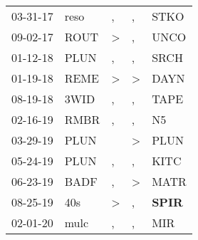 \begin{supertabular}{p{0.07\textwidth}p{0.06\textwidth}p{0.02\textwidth}p{0.02\textwidth}p{0.06\textwidth}}
          03-31-17\textsuperscript{} &           reso\textsuperscript{} &                , &                , &           STKO\textsuperscript{} \\
          09-02-17\textsuperscript{} &           ROUT\textsuperscript{} &     \textgreater &                , &           UNCO\textsuperscript{} \\
          01-12-18\textsuperscript{} &           PLUN\textsuperscript{} &                , &                , &           SRCH\textsuperscript{} \\
          01-19-18\textsuperscript{} &           REME\textsuperscript{} &     \textgreater &     \textgreater &           DAYN\textsuperscript{} \\
          08-19-18\textsuperscript{} &           3WID\textsuperscript{} &                , &                , &           TAPE\textsuperscript{} \\
          02-16-19\textsuperscript{} &           RMBR\textsuperscript{} &                , &                , &             N5\textsuperscript{} \\
          03-29-19\textsuperscript{} &           PLUN\textsuperscript{} &                  &     \textgreater &           PLUN\textsuperscript{} \\
          05-24-19\textsuperscript{} &           PLUN\textsuperscript{} &                , &                , &           KITC\textsuperscript{} \\
          06-23-19\textsuperscript{} &           BADF\textsuperscript{} &                , &     \textgreater &           MATR\textsuperscript{} \\
          08-25-19\textsuperscript{} &            40s\textsuperscript{} &     \textgreater &                , &  \textbf{SPIR\textsuperscript{}} \\
          02-01-20\textsuperscript{} &           mulc\textsuperscript{} &                , &                , &            MIR\textsuperscript{} \\
\end{supertabular}
